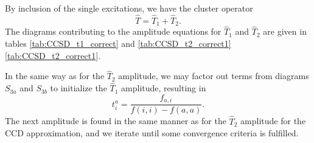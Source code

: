 By inclusion of the single excitations, we have the cluster operator
\begin{equation}
\hat{T} = \hat{T}_1 + \hat{T}_2.
\end{equation}
The diagrams contributing to the amplitude equations for $\hat{T}_1$
and $\hat{T}_2$ are given in tables \ref{tab:CCSD_t1_correct} and
\ref{tab:CCSD_t2_correct1} \ref{tab:CCSD_t2_correct1}.

In the same way as for the $\hat{T}_2$ amplitude, we may factor out terms from
diagrams $S_{3a}$ and $S_{3b}$ to initialize the $\hat{T}_1$ amplitude, resulting in
\begin{equation}
t_i^a = \frac{f_{a,i}}{f(i,i) - f(a,a)}  .
\end{equation}
The next amplitude is found in the same manner as for the $\hat{T}_2$ amplitude
for the CCD approximation, and we iterate until some convergence
criteria is fulfilled.





